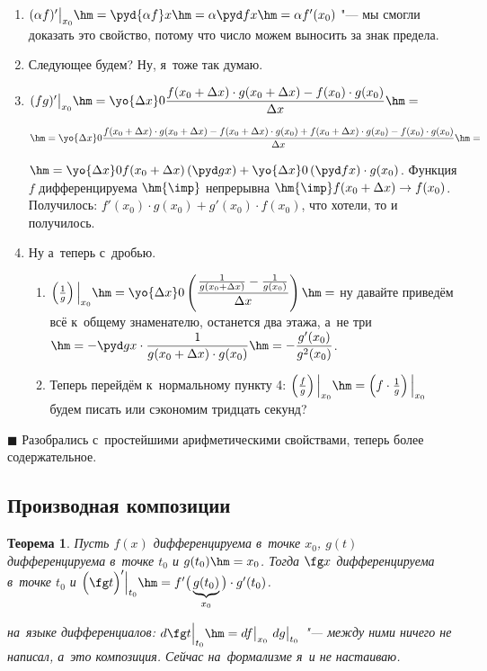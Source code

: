 \documentclass[a4paper,10pt,twoside]{article}
\newtheorem{The}{Теорема}[section]
\newenvironment{Proof}
       {\par\noindent{\textbf{Доказательство.}}}
       {\hfill$\scriptstyle\blacksquare$}
\begin{document}
 \begin{Proof}
\begin{enumerate}
    \item $(\alpha f)'\big|_{x_0}\hm=\pyd{\alpha f}x\hm=\alpha\pyd fx\hm=\alpha f'(x_0)$ "--- мы смогли доказать это свойство, потому что число можем выносить за знак предела.

    \item Следующее будем? Ну, я~тоже так думаю.

    \item $(fg)'\big|_{x_0}\hm=\yo{\Delta x}0\dfrac{f(x_0+\Delta x)\cdot g(x_0+\Delta x)-f(x_0)\cdot g(x_0)}
    {\Delta x}\hm=$

    $\hm=\yo{\Delta x}0\dfrac{f(x_0+\Delta x)\cdot g(x_0+\Delta x)
    -f(x_0+\Delta x)\cdot g(x_0)+f(x_0+\Delta x)\cdot g(x_0)
    -f(x_0)\cdot g(x_0)}
    {\Delta x}\hm=$

    $\hm=\yo{\Delta x}0f(x_0+\Delta x)\left(\pyd gx\right)+\yo{\Delta x}0\left(\pyd fx\right)\cdot g(x_0)$. Функция
    $f$ дифференцируема $\hm{\imp}$ непрерывна $\hm{\imp} f(x_0+\Delta x)\to f(x_0)$. Получилось: $f'(x_0)\cdot g(x_0)+g'(x_0)\cdot f(x_0)$, что хотели, то и получилось.

    \item Ну а~теперь с~дробью.

    \begin{enumerate}
        \item $\left(\frac1g\right)\Big|_{x_0}\hm=\yo{\Delta x}0\left(\dfrac{\frac1{g(x_0+\Delta x)}-\frac1{g(x_0)}}{\Delta x}\right)\hm=$ ну давайте приведём всё
            к~общему знаменателю, останется два этажа, а~не три$\hm=-\pyd gx\cdot\dfrac1{g(x_0+\Delta x)\cdot g(x_0)}\hm=
            -\dfrac{g'(x_0)}{g^2(x_0)}$.

        \item Теперь перейдём к~нормальному пункту 4: $\left(\frac fg\right)\Big|_{x_0}\hm=\left(f\cdot \frac1g\right)\Big|_{x_0}$ будем писать или сэкономим тридцать секунд?
    \end{enumerate}
\end{enumerate}
\end{Proof}
Разобрались с~простейшими арифметическими свойствами, теперь более содержательное.

\subsection{Производная композиции}

\begin{The}\label{tprk}
    Пусть $f(x)$ дифференцируема в~точке $x_0$, $g(t)$ дифференцируема в~точке $t_0$ и $g(t_0)\hm=x_0$. Тогда $\fg x$ дифференцируема в~точке $t_0$ и
    $\Big(\fg t\Big)'\Big|_{t_0}\hm=f'\big(\underbrace{g(t_0)}_{x_0}\big)\cdot g'(t_0)$.

    на~языке дифференциалов: $d\fg t\Big|_{t_0}\hm=df\big|_{x_0}\  dg\big|_{t_0}$ "--- между ними ничего не написал, а~это композиция. Сейчас на~формализме я~и не настаиваю.
\end{The}
\end{document}
